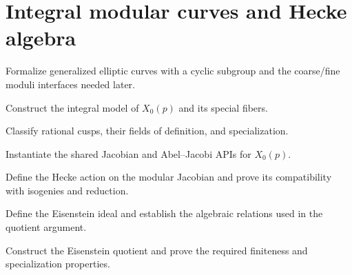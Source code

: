 \section{Integral modular curves and Hecke algebra}

\begin{milestone}\label{node:MT-X0-MODULI}
Formalize generalized elliptic curves with a cyclic subgroup and the
coarse/fine moduli interfaces needed later.
\leanpending
\end{milestone}

\begin{milestone}\label{node:MT-X0-INTEGRAL}
Construct the integral model of \(X_0(p)\) and its special fibers.
\leanpending
\end{milestone}

\begin{theorem}\label{node:MT-X0-CUSPS}
Classify rational cusps, their fields of definition, and specialization.
\leanpending
\end{theorem}

\begin{milestone}\label{node:MT-X0-JACOBIAN}
Instantiate the shared Jacobian and Abel--Jacobi APIs for \(X_0(p)\).
\leanpending
\end{milestone}

\begin{milestone}\label{node:MT-X0-HECKE}
Define the Hecke action on the modular Jacobian and prove its compatibility
with isogenies and reduction.
\leanpending
\end{milestone}

\begin{theorem}\label{node:MT-X0-EISENSTEIN-ALGEBRA}
Define the Eisenstein ideal and establish the algebraic relations used in the
quotient argument.
\leanpending
\end{theorem}

\begin{theorem}\label{node:MT-X0-EISENSTEIN-QUOTIENT}
Construct the Eisenstein quotient and prove the required finiteness and
specialization properties.
\leanpending
\end{theorem}

